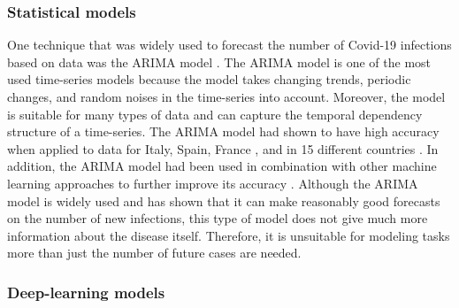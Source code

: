 \subsubsection{Statistical models}

One technique that was widely used to forecast the number of Covid-19 infections based on data was the \gls{ARIMA} model \cite{box2015time}.
The \gls{ARIMA} model is one of the most used time-series models because the model takes changing trends, periodic changes, and random noises in the time-series into account.
Moreover, the model is suitable for many types of data and can capture the temporal dependency structure of a time-series.
The \gls{ARIMA} model had shown to have high accuracy when applied to data for Italy, Spain, France \cite{ceylanEstimationCOVID19Prevalence2020}, and in 15 different countries \cite{singhPredictionCOVID19Pandemic2020}.
In addition, the \gls{ARIMA} model had been used in combination with other machine learning approaches to further improve its accuracy \cite{ribeiroShorttermForecastingCOVID192020}.
Although the \gls{ARIMA} model is widely used and has shown that it can make reasonably good forecasts on the number of new infections, this type of model does not give much more information about the disease itself.
Therefore, it is unsuitable for modeling tasks more than just the number of future cases are needed.

\subsubsection{Deep-learning models}

